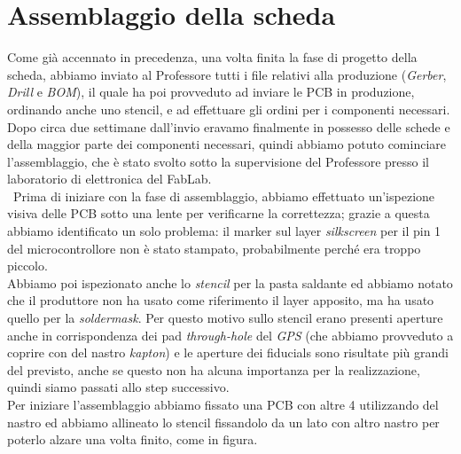 \chapter{Assemblaggio della scheda}

Come già accennato in precedenza, una volta finita la fase di progetto della scheda, abbiamo inviato al Professore tutti i file relativi alla produzione (\textit{Gerber}, \textit{Drill} e \textit{BOM}), il quale ha poi provveduto ad inviare le PCB in produzione, ordinando anche uno stencil, e ad effettuare gli ordini per i componenti necessari.
Dopo circa due settimane dall’invio eravamo finalmente in possesso delle schede e della maggior parte dei componenti necessari, quindi abbiamo potuto cominciare l’assemblaggio, che è stato svolto sotto la supervisione del Professore presso il laboratorio di elettronica del FabLab. \\\
Prima di iniziare con la fase di assemblaggio, abbiamo effettuato un’ispezione visiva delle PCB sotto una lente per verificarne la correttezza; grazie a questa abbiamo identificato un solo problema: il marker sul layer \textit{silkscreen} per il pin 1 del microcontrollore non è stato stampato, probabilmente perché era troppo piccolo. \\
Abbiamo poi ispezionato anche lo \textit{stencil} per la pasta saldante ed abbiamo notato che il produttore non ha usato come riferimento il layer apposito, ma ha usato quello per la \textit{soldermask}. Per questo motivo sullo stencil erano presenti aperture anche in corrispondenza dei pad \textit{through-hole} del \textit{GPS} (che abbiamo provveduto a coprire con del nastro \textit{kapton}) e le aperture dei fiducials sono risultate più grandi del previsto, anche se questo non ha alcuna importanza per la realizzazione, quindi siamo passati allo step successivo. \\
Per iniziare l’assemblaggio abbiamo fissato una PCB con altre 4 utilizzando del nastro ed abbiamo allineato lo stencil fissandolo da un lato con altro nastro per poterlo alzare una volta finito, come in figura.


